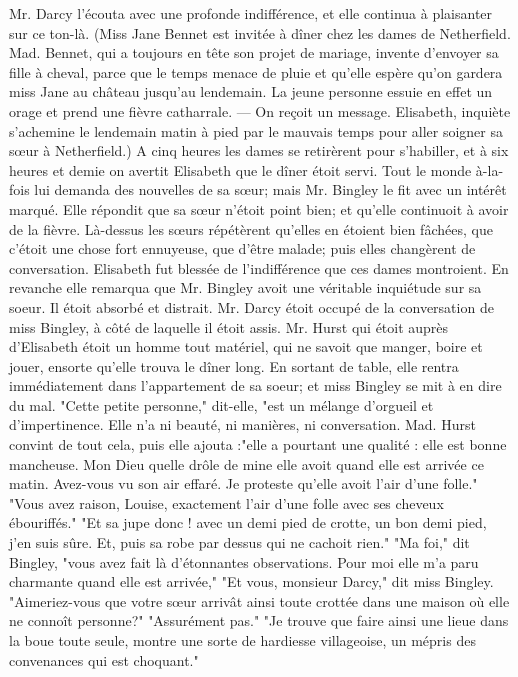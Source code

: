 Mr. Darcy l'écouta avec une profonde indifférence, et elle continua à plaisanter sur ce ton-là.
(Miss Jane Bennet est invitée à dîner chez les dames de Netherfield. Mad. Bennet, qui a toujours en tête son projet de mariage, invente d'envoyer sa fille à cheval, parce que le temps menace de pluie et qu'elle espère qu'on gardera miss Jane au château jusqu'au lendemain. La jeune personne essuie en effet un orage et prend une fièvre catharrale. — On reçoit un message. Elisabeth, inquiète s'achemine le lendemain matin à pied par le mauvais temps pour aller soigner sa sœur à Netherfield.)
A cinq heures les dames se retirèrent pour s'habiller, et à six heures et demie on avertit Elisabeth que le dîner étoit servi. Tout le monde à-la-fois lui demanda des nouvelles de sa sœur; mais Mr. Bingley le fit avec un intérêt marqué. Elle répondit que sa sœur n'étoit point bien; et qu'elle continuoit à avoir de la fièvre. Là-dessus les sœurs répétèrent qu'elles en étoient bien fâchées, que c'étoit une chose fort ennuyeuse, que d'être malade; puis elles changèrent de conversation.\setcounter{page}{389} Elisabeth fut blessée de l'indifférence que ces dames montroient. En revanche elle remarqua que Mr. Bingley avoit une véritable inquiétude sur sa soeur. Il étoit absorbé et distrait. Mr. Darcy étoit occupé de la conversation de miss Bingley, à côté de laquelle il étoit assis. Mr. Hurst qui étoit auprès d'Elisabeth étoit un homme tout matériel, qui ne savoit que manger, boire et jouer, ensorte qu'elle trouva le dîner long. En sortant de table, elle rentra immédiatement dans l'appartement de sa soeur; et miss Bingley se mit à en dire du mal. "Cette petite personne," dit-elle, "est un mélange d'orgueil et d'impertinence. Elle n'a ni beauté, ni manières, ni conversation. Mad. Hurst convint de tout cela, puis elle ajouta :"elle a pourtant une qualité : elle est bonne mancheuse. Mon Dieu quelle drôle de mine elle avoit quand elle est arrivée ce matin. Avez-vous vu son air effaré. Je proteste qu'elle avoit l'air d'une folle."
"Vous avez raison, Louise, exactement l'air d'une folle avec ses cheveux ébouriffés."
"Et sa jupe donc ! avec un demi pied de crotte, un bon demi pied, j'en suis sûre. Et, puis sa robe par dessus qui ne cachoit rien."
"Ma foi," dit Bingley, "vous avez fait là\setcounter{page}{390} d'étonnantes observations. Pour moi elle m'a paru charmante quand elle est arrivée,"
"Et vous, monsieur Darcy," dit miss Bingley. "Aimeriez-vous que votre sœur arrivât ainsi toute crottée dans une maison où elle ne connoît personne?"
"Assurément pas."
"Je trouve que faire ainsi une lieue dans la boue toute seule, montre une sorte de hardiesse villageoise, un mépris des convenances qui est choquant."
